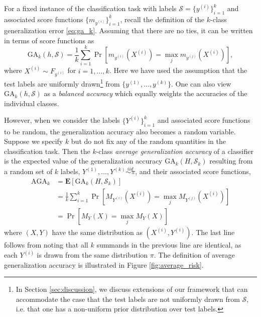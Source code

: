 \documentclass[twoside,11pt]{article}
\newcommand{\E}{\textbf{E}}
\begin{document}
For a fixed instance of the classification task with labels
$\mathcal{S} = \{y^{(i)}\}_{i=1}^k$ and associated score functions
$\{m_{y^{(i)}}\}_{i=1}^k$, recall the definition of the $k$-class
generalization error \eqref{eq:ga_k}.  Assuming that there are no
ties, it can be written in terms of score functions as
\[
\text{GA}_k(h, \mathcal{S}) = \frac{1}{k} \sum_{i=1}^k  \Pr[m_{y^{(i)}}(X^{(i)}) = \max_j
m_{y^{(j)}}(X^{(i)})],
\]
where $X^{(i)} \sim F_{y^{(i)}}$ for $i =1,\hdots, k$.  Here we have used the assumption that the test labels are uniformly drawn\footnote{In Section \ref{sec:discussion}, we discuss extensions of our framework that can accommodate the case that the test labels are not uniformly drawn from $\mathcal{S}$, i.e. that one has a non-uniform prior distribution over test labels.} from $\{y^{(1)},\hdots, y^{(k)}\}$.
One can also view $\text{GA}_k(h, \mathcal{S})$ as a \emph{balanced accuracy} which equally weights the accuracies of the individual classes.

However, when we consider the labels $\{Y^{(i)}\}_{i=1}^k$ and associated score
functions to be random, the generalization accuracy also becomes a
random variable.
Suppose we specify $k$ but do not fix any of the random quantities in
the classification task.  Then the $k$-class \emph{average
  generalization accuracy} of a classifier is the expected value of
the generalization accuracy $\text{GA}_k(H, \mathcal{S}_k)$ resulting from a random
set of $k$ labels, $Y^{(1)}, \hdots, Y^{(k)} \stackrel{iid}{\sim
  \pi}$, and their associated score functions,
\begin{align*}
\text{AGA}_k &= \E[\text{GA}_k(H, \mathcal{S}_k)]
\\&= \frac{1}{k} \sum_{i=1}^k \Pr[M_{Y^{(i)}}(X^{(i)}) = \max_j
M_{Y^{(j)}}(X^{(i)})]
\\&= \Pr[M_{Y}(X) = \max_j M_{Y}(X)]
\end{align*}
where $(X,Y)$ have the same distribution as $(X^{(i)}, Y^{(i)})$. %
The last line follows from noting that all $k$ summands in the
previous line are identical, as each $Y^{(i)}$ is drawn from the same distribution $\pi$.  %
The definition of average
  generalization accuracy is illustrated in Figure
  \ref{fig:average_risk}.
\end{document}
